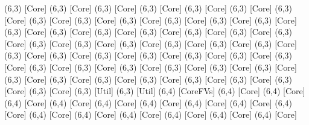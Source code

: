 {(6,3) [Core] %
(6,3) [Core] %
(6,3) [Core] %
(6,3) [Core] %
(6,3) [Core] %
(6,3) [Core] %
(6,3) [Core] %
(6,3) [Core] %
(6,3) [Core] %
(6,3) [Core] %
(6,3) [Core] %
(6,3) [Core] %
(6,3) [Core] %
(6,3) [Core] %
(6,3) [Core] %
(6,3) [Core] %
(6,3) [Core] %
(6,3) [Core] %
(6,3) [Core] %
(6,3) [Core] %
(6,3) [Core] %
(6,3) [Core] %
(6,3) [Core] %
(6,3) [Core] %
(6,3) [Core] %
(6,3) [Core] %
(6,3) [Core] %
(6,3) [Core] %
(6,3) [Core] %
(6,3) [Core] %
(6,3) [Core] %
(6,3) [Core] %
(6,3) [Core] %
(6,3) [Core] %
(6,3) [Core] %
(6,3) [Core] %
(6,3) [Core] %
(6,3) [Core] %
(6,3) [Core] %
(6,3) [Core] %
(6,3) [Core] %
(6,3) [Core] %
(6,3) [Core] %
(6,3) [Core] %
(6,3) [Core] %
(6,3) [Core] %
(6,3) [Core] %
(6,3) [Util] %
(6,3) [Util] %
(6,4) [CoreFVs] %
(6,4) [Core] %
(6,4) [Core] %
(6,4) [Core] %
(6,4) [Core] %
(6,4) [Core] %
(6,4) [Core] %
(6,4) [Core] %
(6,4) [Core] %
(6,4) [Core] %
(6,4) [Core] %
(6,4) [Core] %
(6,4) [Core] %
(6,4) [Core] %
(6,4) [Core] %
(6,4) [Core] %
}

